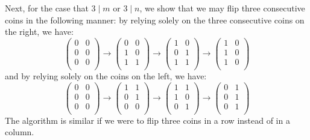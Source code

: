 \documentclass[11pt,a4paper]{article}
\begin{document}
\begin{enumerate}
    	Next, for the case that $3\mid m$ or $3\mid n$, 
    	we show that we may flip three consecutive coins in the following manner: 
    	by relying solely on the three consecutive coins on the right, 
    	we have: 
    	\[
    	\begin{pmatrix}
    		0 & 0\\
    		0 & 0\\
    		0 & 0\\
    	\end{pmatrix}
    	\to 
    	\begin{pmatrix}
    		0 & 0\\
    		1 & 0\\
    		1 & 1\\
    	\end{pmatrix}
    	\to 
    	\begin{pmatrix}
    		1 & 0\\
    		0 & 1\\
    		1 & 1\\
    	\end{pmatrix}
    	\to 
    	\begin{pmatrix}
    		1 & 0\\
    		1 & 0\\
    		1 & 0\\
    	\end{pmatrix}
    	\]
    	and by relying solely on the coins on the left, we have: 
    	\[
    	\begin{pmatrix}
    		0 & 0\\
    		0 & 0\\
    		0 & 0\\
    	\end{pmatrix}
    	\to 
    	\begin{pmatrix}
    		1 & 1\\
    		0 & 1\\
    		0 & 0\\
    	\end{pmatrix}
    	\to 
    	\begin{pmatrix}
    		1 & 1\\
    		1 & 0\\
    		0 & 1\\
    	\end{pmatrix}
    	\to 
    	\begin{pmatrix}
    		0 & 1\\
    		0 & 1\\
    		0 & 1\\
    	\end{pmatrix}
    	\]
    	The algorithm is similar if we were to flip three coins in a row instead of in a column. 
    	

\end{enumerate}
\end{document}
